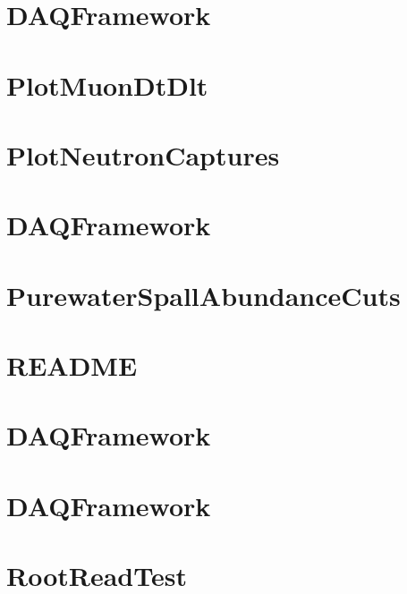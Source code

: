 \let\mypdfximage\pdfximage\def\pdfximage{\immediate\mypdfximage}\documentclass[twoside]{book}
\newcommand{\+}{\discretionary{\mbox{\scriptsize$\hookleftarrow$}}{}{}}
\begin{document}
\chapter{DAQFramework}
\label{md_UserTools_PlotHitTimes_README}

\chapter{Plot\+Muon\+Dt\+Dlt}
\label{md_UserTools_PlotMuonDtDlt_README}

\chapter{Plot\+Neutron\+Captures}
\label{md_UserTools_PlotNeutronCaptures_README}

\chapter{DAQFramework}
\label{md_UserTools_PrintEvent_README}

\chapter{Purewater\+Spall\+Abundance\+Cuts}
\label{md_UserTools_PurewaterSpallAbundanceCuts_README}

\chapter{README}
\label{md_UserTools_ReadMCInfo_README}

\chapter{DAQFramework}
\label{md_UserTools_ReadMCParticles_README}

\chapter{DAQFramework}
\label{md_UserTools_README}

\chapter{Root\+Read\+Test}
\label{md_UserTools_RootReadTest_README}

\end{document}
